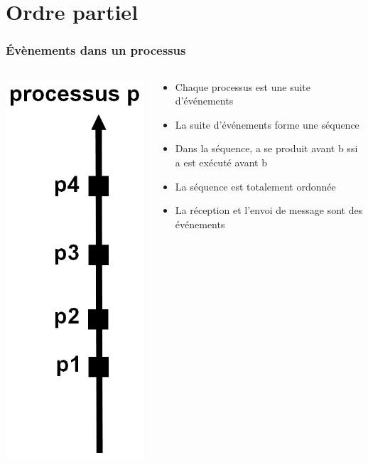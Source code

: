 \documentclass[compress]{beamer}
\begin{document}
\section{Ordre partiel}

\begin{frame}
\frametitle{\'Evènements dans un processus}
\begin{columns}
    \begin{column}{0.2\textwidth}
    \includegraphics[scale=0.7]{clem1.png}
    \end{column}
  
    \begin{column}{0.8 \textwidth}
    \begin{itemize}
    \item Chaque processus est une suite d'événements
    \item La suite d'événements forme une séquence
    \item Dans la séquence, a se produit avant b ssi a est exécuté avant b
    \item La séquence est totalement ordonnée
    \item La réception et l'envoi de message sont des événements
    \end{itemize}
    \end{column}
\end{columns}
\end{frame}
\end{document}

